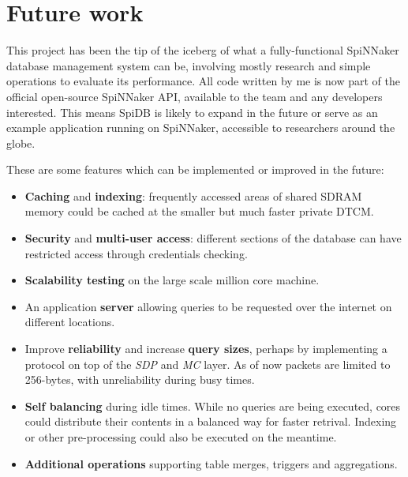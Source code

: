 \section{Future work}
This project has been the tip of the iceberg of what a fully-functional SpiNNaker database management system can be, involving mostly research and simple operations to evaluate its performance. All code written by me is now part of the official open-source SpiNNaker API, available to the team and any developers interested. This means SpiDB is likely to expand in the future or serve as an example application running on SpiNNaker, accessible to researchers around the globe.

These are some features which can be implemented or improved in the future:

\begin{itemize}
	\item \textbf{Caching} and \textbf{indexing}: frequently accessed areas of shared SDRAM memory could be cached at the smaller but much faster private DTCM.
	\item \textbf{Security} and \textbf{multi-user access}: different sections of the database can have restricted access through credentials checking.
	\item \textbf{Scalability testing} on the large scale million core machine.
	\item An application \textbf{server} allowing queries to be requested over the internet on different locations.
	\item Improve \textbf{reliability} and increase \textbf{query sizes}, perhaps by implementing a protocol on top of the \textit{SDP} and \textit{MC} layer. As of now packets are limited to 256-bytes, with unreliability during busy times.
	\item \textbf{Self balancing} during idle times. While no queries are being executed, cores could distribute their contents in a balanced way for faster retrival. Indexing or other pre-processing could also be executed on the meantime.
	\item \textbf{Additional operations} supporting table merges, triggers and aggregations.
\end{itemize}